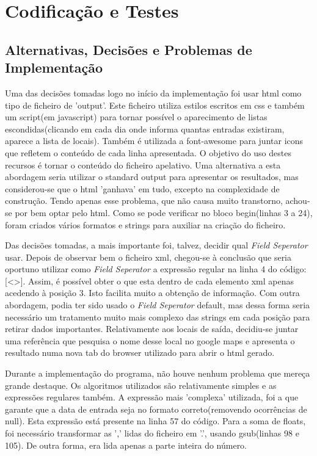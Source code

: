 \documentclass{report}
\def\fs{\emph{Field Seperator}\xspace}
\begin{document}
\chapter{Codificação e Testes} \label{ct}
\section{Alternativas, Decisões e Problemas de Implementação}
Uma das decisões tomadas logo no início da implementação foi usar html como tipo de ficheiro de 'output'.
Este ficheiro utiliza estilos escritos em css e também um script(em javascript) para 
tornar possível o aparecimento de listas escondidas(clicando em cada dia onde 
informa quantas entradas existiram, aparece a lista de locais). 
Também é utilizada a font-awesome para juntar icons que refletem o conteúdo de cada linha apresentada. 
O objetivo do uso destes recursos é tornar o conteúdo do ficheiro apelativo.
Uma alternativa a esta abordagem seria utilizar o standard output para
apresentar os resultados, mas considerou-se que o html 'ganhava' em tudo, 
excepto na complexidade de construção. Tendo apenas esse problema, que não
causa muito transtorno, achou-se por bem optar pelo html.
Como se pode verificar no bloco begin(linhas 3 a 24), foram criados vários formatos e strings para auxiliar na criação do ficheiro.\par
Das decisões tomadas, a mais importante foi, talvez, decidir qual \fs usar. Depois de observar bem o ficheiro xml, chegou-se à 
conclusão que seria oportuno utilizar como \fs a expressão regular na linha 4 do código: [\textless\textgreater]. Assim, é possível obter 
o que esta dentro de cada elemento xml apenas acedendo à posição 3. Isto facilita muito a obtenção de informação.
Com outra abordagem, podia ter sido usado o \fs default, mas dessa
forma seria necessário um tratamento muito mais complexo das strings
em cada posição para retirar dados importantes. 
Relativamente aos locais de saída, decidiu-se juntar uma referência que pesquisa o nome desse local no google maps e apresenta o resultado
numa nova tab do browser utilizado para abrir o html gerado. \par
Durante a implementação do programa, não houve nenhum problema que mereça 
grande destaque. Os algoritmos utilizados são relativamente simples e as 
expressões regulares também. A expressão mais 'complexa' utilizada, foi a 
que garante que a data de entrada seja no formato correto(removendo ocorrências de null). Esta expressão está presente na linha 57 do código.
Para a soma de floats, foi necessário transformar as ',' lidas do ficheiro
em '.', usando gsub(linhas 98 e 105). De outra forma, era lida apenas a parte inteira do número.
\end{document}
